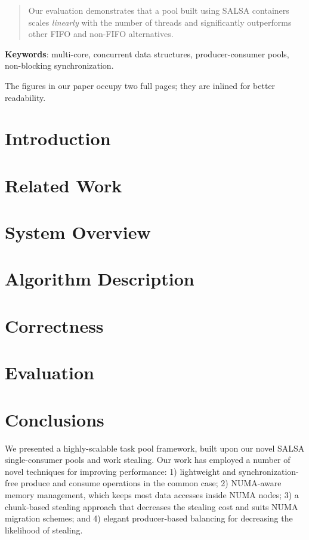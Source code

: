\documentclass[11pt]{article}
\theoremstyle{plain}
\newcommand{\negspace}{\vspace{-0.6\baselineskip}}
\begin{document}
\begin{titlepage}
\begin{abstract}
Our evaluation demonstrates that a pool built using SALSA containers scales \emph{linearly} with the number of threads and significantly outperforms other FIFO and non-FIFO alternatives.

\end{abstract}

\bigskip

\centerline{{\bf Keywords}: multi-core, concurrent data structures, producer-consumer pools, non-blocking synchronization.}

\vspace{2.5cm}

\centerline{The figures in our paper occupy two full pages; they are inlined for better readability.}

\end{titlepage}
\negspace
\section{Introduction}
\label{sec:intro}

\negspace
\section{Related Work}
\label{sec:related}

\negspace
\section{System Overview}
\label{sec:system}

\negspace
\section{Algorithm Description}
\label{sec:algo}

\negspace
\section{Correctness}
\label{sec:correctness}

\negspace
\section{Evaluation}
\label{sec:evaluation}

\negspace
\section{Conclusions}
\label{sec:conclusions}
\negspace
We presented a highly-scalable task pool framework, built upon
our novel SALSA single-consumer pools and work stealing.
Our work has employed a number of novel techniques for improving
performance: 1) lightweight and synchronization-free produce and consume operations in the common case; 
2) NUMA-aware memory management, which keeps most data accesses inside NUMA nodes;
3) a chunk-based stealing approach that decreases the stealing cost and suits NUMA migration schemes; and 4) elegant producer-based
balancing for decreasing the likelihood of stealing.
\end{document}
